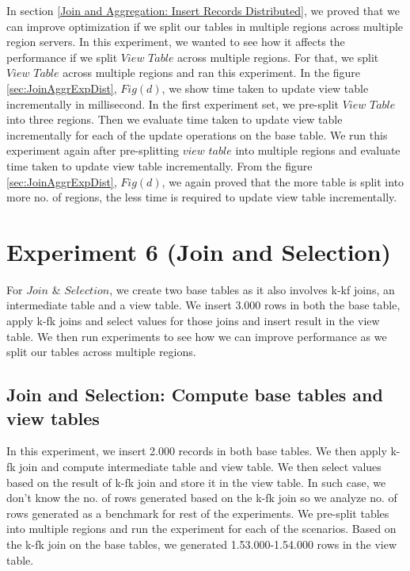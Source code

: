\documentclass[11pt,a4paper,bibtotoc,idxtotoc,headsepline,footsepline,footexclude,BCOR12mm,DIV13]{scrbook}
\begin{document}
In section \ref{Join and Aggregation: Insert Records Distributed},  we proved that we can improve optimization if we split our tables in multiple regions across multiple region servers. In this experiment, we wanted to see how it affects the performance if we split $View$ $Table$ across multiple regions. For that, we split $View$ $Table$ across multiple regions and ran this experiment. 
In the figure \ref{sec:JoinAggrExpDist}, $Fig(d)$, we show time taken to update view table incrementally in millisecond. In the first experiment set, we pre-split $View$ $Table$ into three regions. Then we evaluate time taken to update view table incrementally for each of the update operations on the base table. We run this experiment again after pre-splitting $view$ $table$ into multiple regions and evaluate time taken to update view table incrementally. From the figure \ref{sec:JoinAggrExpDist}, $Fig(d)$, we again proved that the more table is split into more no. of regions, the less time is required to update view table incrementally. 

\section{Experiment 6 (Join and Selection)}
\label{(sec:Join and Selection Exp Distributed)} 
For $Join$ \& $Selection$, we create two base tables as it also involves k-kf joins, an intermediate table and a view table. We insert 3.000 rows in both the base table, apply k-fk joins and select values for those joins and insert result in the view table. We then run experiments to see how we can improve performance as we split our tables across multiple regions.

\subsection{Join and Selection: Compute base tables and view tables}
\label{Join and Selection: Compute base tables and view table}
In this experiment, we insert 2.000 records in both base tables. We then apply k-fk join and compute intermediate table and view table. We then select values based on the result of k-fk join and store it in the view table. In such case, we don't know the no. of rows generated based on the k-fk join so we analyze no. of rows generated as a benchmark for rest of the experiments. We pre-split tables into multiple regions and run the experiment for each of the scenarios. Based on the k-fk join on the base tables, we generated 1.53.000-1.54.000 rows in the view table.
\end{document}
